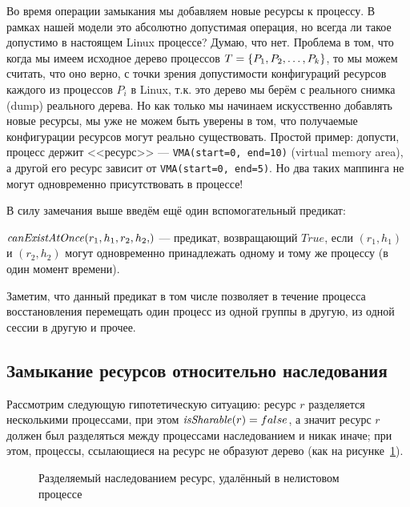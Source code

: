 \begin{note}
\label{note:badresourceconfig}
Во время операции замыкания мы добавляем новые ресурсы к процессу. В рамках нашей модели это абсолютно допустимая операция, но всегда ли такое допустимо в настоящем Linux процессе? Думаю, что нет. Проблема в том, что когда мы имеем исходное дерево процессов $T = \left\lbrace P_1, P_2, \ldots, P_k \right\rbrace$, то мы можем считать, что оно верно, с точки зрения допустимости конфигураций ресурсов каждого из процессов $P_i$ в Linux, т.к. это дерево мы берём с реального снимка (dump) реального дерева. Но как только мы начинаем искусственно добавлять новые ресурсы, мы уже не можем быть уверены в том, что получаемые конфигурации ресурсов могут реально существовать. Простой пример: допусти, процесс держит <<ресурс>> --- \texttt{VMA(start=0, end=10)} (virtual memory area), а другой его ресурс зависит от \texttt{VMA(start=0, end=5)}. Но два таких маппинга не могут одновременно присутствовать в процессе!
\end{note}

В силу замечания выше введём ещё один вспомогательный предикат:

\begin{defn}
$\canExistAtOnce{r_1, h_1, r_2, h_2}$ --- предикат, возвращающий $True$, если $(r_1, h_1)$ и $(r_2, h_2)$ могут одновременно принадлежать одному и тому же процессу (в один момент времени).
\end{defn}

\begin{note}
Заметим, что данный предикат в том числе позволяет в течение процесса восстановления перемещать один процесс из одной группы в другую, из одной сессии в другую и прочее.
\end{note}

\subsection{Замыкание ресурсов относительно наследования}

Рассмотрим следующую гипотетическую ситуацию: ресурс $r$ разделяется несколькими процессами, при этом $\text{\textit{isSharable}}(r) = false$, а значит ресурс $r$ должен был разделяться между процессами наследованием и никак иначе; при этом, процессы, ссылающиеся на ресурс не образуют дерево (как на рисунке~\ref{fig:inherithole}). 

\begin{figure}[ht!]
\centering
{}
\caption{Разделяемый наследованием ресурс, удалённый в нелистовом процессе}
\label{fig:inherithole}
\end{figure}

